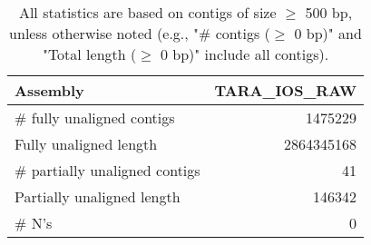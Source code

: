 \documentclass[12pt,a4paper]{article}
\begin{document}
\begin{table}[ht]
\begin{center}
\caption{All statistics are based on contigs of size $\geq$ 500 bp, unless otherwise noted (e.g., "\# contigs ($\geq$ 0 bp)" and "Total length ($\geq$ 0 bp)" include all contigs).}
\begin{tabular}{|l*{1}{|r}|}
\hline
Assembly & TARA\_IOS\_RAW \\ \hline
\# fully unaligned contigs & 1475229 \\ \hline
Fully unaligned length & 2864345168 \\ \hline
\# partially unaligned contigs & 41 \\ \hline
Partially unaligned length & 146342 \\ \hline
\# N's & 0 \\ \hline
\end{tabular}
\end{center}
\end{table}
\end{document}
